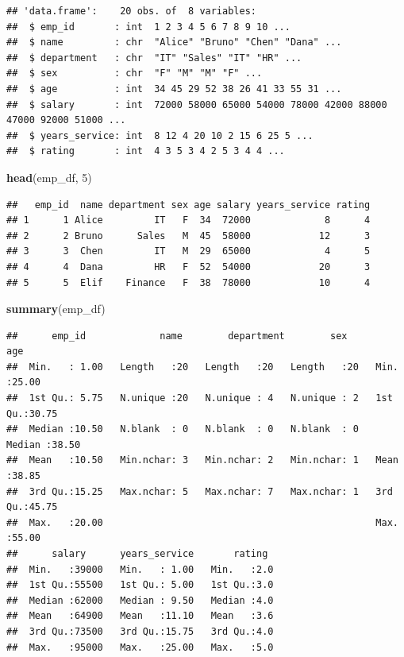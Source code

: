 \documentclass[
]{article}
\newenvironment{Shaded}{\begin{snugshade}}{\end{snugshade}}
\newcommand{\DecValTok}[1]{\textcolor[rgb]{0.00,0.00,0.81}{#1}}
\newcommand{\FunctionTok}[1]{\textcolor[rgb]{0.13,0.29,0.53}{\textbf{#1}}}
\newcommand{\NormalTok}[1]{#1}
\begin{document}
\begin{verbatim}
## 'data.frame':    20 obs. of  8 variables:
##  $ emp_id       : int  1 2 3 4 5 6 7 8 9 10 ...
##  $ name         : chr  "Alice" "Bruno" "Chen" "Dana" ...
##  $ department   : chr  "IT" "Sales" "IT" "HR" ...
##  $ sex          : chr  "F" "M" "M" "F" ...
##  $ age          : int  34 45 29 52 38 26 41 33 55 31 ...
##  $ salary       : int  72000 58000 65000 54000 78000 42000 88000 47000 92000 51000 ...
##  $ years_service: int  8 12 4 20 10 2 15 6 25 5 ...
##  $ rating       : int  4 3 5 3 4 2 5 3 4 4 ...
\end{verbatim}

\begin{Shaded}
\begin{Highlighting}[]
\FunctionTok{head}\NormalTok{(emp\_df, }\DecValTok{5}\NormalTok{)}
\end{Highlighting}
\end{Shaded}

\begin{verbatim}
##   emp_id  name department sex age salary years_service rating
## 1      1 Alice         IT   F  34  72000             8      4
## 2      2 Bruno      Sales   M  45  58000            12      3
## 3      3  Chen         IT   M  29  65000             4      5
## 4      4  Dana         HR   F  52  54000            20      3
## 5      5  Elif    Finance   F  38  78000            10      4
\end{verbatim}

\begin{Shaded}
\begin{Highlighting}[]
\FunctionTok{summary}\NormalTok{(emp\_df)}
\end{Highlighting}
\end{Shaded}

\begin{verbatim}
##      emp_id             name        department        sex          age       
##  Min.   : 1.00   Length   :20   Length   :20   Length   :20   Min.   :25.00  
##  1st Qu.: 5.75   N.unique :20   N.unique : 4   N.unique : 2   1st Qu.:30.75  
##  Median :10.50   N.blank  : 0   N.blank  : 0   N.blank  : 0   Median :38.50  
##  Mean   :10.50   Min.nchar: 3   Min.nchar: 2   Min.nchar: 1   Mean   :38.85  
##  3rd Qu.:15.25   Max.nchar: 5   Max.nchar: 7   Max.nchar: 1   3rd Qu.:45.75  
##  Max.   :20.00                                                Max.   :55.00  
##      salary      years_service       rating   
##  Min.   :39000   Min.   : 1.00   Min.   :2.0  
##  1st Qu.:55500   1st Qu.: 5.00   1st Qu.:3.0  
##  Median :62000   Median : 9.50   Median :4.0  
##  Mean   :64900   Mean   :11.10   Mean   :3.6  
##  3rd Qu.:73500   3rd Qu.:15.75   3rd Qu.:4.0  
##  Max.   :95000   Max.   :25.00   Max.   :5.0
\end{verbatim}
\end{document}
